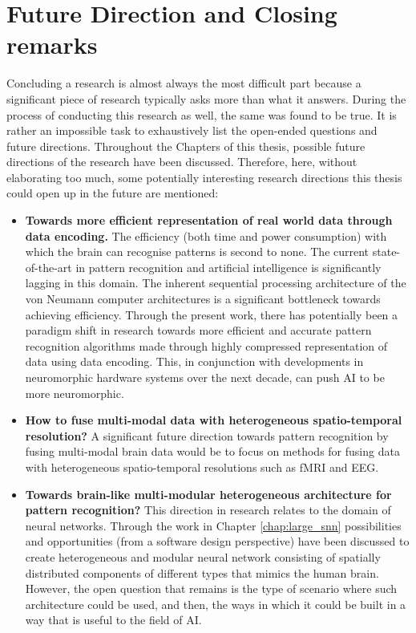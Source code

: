 \section{Future Direction and Closing remarks}
Concluding a research is almost always the most difficult part because a significant piece of research typically asks more than what it answers. During the process of conducting this research as well, the same was found to be true. It is rather an impossible task to exhaustively list the open-ended questions and future directions. Throughout the Chapters of this thesis, possible future directions of the research have been discussed. Therefore, here, without elaborating too much, some potentially interesting research directions this thesis could open up in the future are mentioned:
\begin{itemize}
	\item \textbf{Towards more efficient representation of real world data through data encoding.} The efficiency (both time and power consumption) with which the brain can recognise patterns is second to none. The current state-of-the-art in pattern recognition and artificial intelligence is significantly lagging in this domain. The inherent sequential processing architecture of the von Neumann computer architectures is a significant bottleneck towards achieving efficiency. Through the present work, there has potentially been a paradigm shift in research towards more efficient and accurate pattern recognition algorithms made through highly compressed representation of data using data encoding. This, in conjunction with developments in neuromorphic hardware systems over the next decade, can push AI to be more neuromorphic. 
	\item\textbf{How to fuse multi-modal data with heterogeneous spatio-temporal resolution?} A significant future direction towards pattern recognition by fusing multi-modal brain data would be to focus on methods for fusing data with heterogeneous spatio-temporal resolutions such as fMRI and EEG. 
	\item \textbf{ Towards brain-like multi-modular heterogeneous architecture for pattern recognition?} This direction in research relates to the domain of neural networks. Through the work in Chapter \ref{chap:large_snn} possibilities and opportunities (from a software design perspective) have been discussed to create heterogeneous and modular neural network consisting of spatially distributed components of different types that mimics the human brain. However, the open question that remains is the type of scenario where such architecture could be used, and then, the ways in which it could be built in a way that is useful to the field of AI.  
\end{itemize}

	

